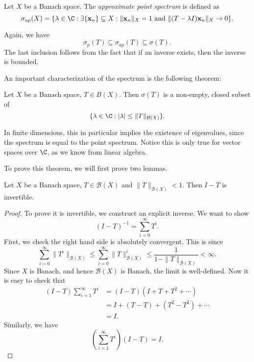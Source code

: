 \documentclass[a4paper]{article}
\begin{document}
\begin{defi}
  Let $X$ be a Banach space. The \emph{approximate point spectrum} is defined as
  \[
    \sigma_{ap}(X) = \{ \lambda \in \C: \exists \{\mathbf{x}_n\} \subseteq X: \|\mathbf{x}_n\|_X = 1\text{ and }\|(T - \lambda I)\mathbf{x}_n\|_X \to 0\}.
  \]
\end{defi}
Again, we have
\[
  \sigma_p(T) \subseteq \sigma_{ap}(T) \subseteq \sigma(T).
\]
The last inclusion follows from the fact that if an inverse exists, then the inverse is bounded.

An important characterization of the spectrum is the following theorem:
\begin{thm}
  Let $X$ be a Banach space, $T \in B(X)$. Then $\sigma(T)$ is a non-empty, closed subset of
  \[
    \{\lambda \in \C: |\lambda| \leq \|T\|_{\mathcal{B}(X)}\}.
  \]
\end{thm}
In finite dimensions, this in particular implies the existence of eigenvalues, since the spectrum is equal to the point spectrum. Notice this is only true for vector spaces over $\C$, as we know from linear algebra.

To prove this theorem, we will first prove two lemmas.
\begin{lemma}
  Let $X$ be a Banach space, $T \in \mathcal{B}(X)$ and $\|T\|_{\mathcal{B}(X)} < 1$. Then $I - T$ is invertible.
\end{lemma}

\begin{proof}
  To prove it is invertible, we construct an explicit inverse. We want to show
  \[
    (I - T)^{-1} = \sum_{i = 0}^\infty T^i.
  \]
  First, we check the right hand side is absolutely convergent. This is since
  \[
    \sum_{i = 0}^\infty \|T^i\|_{\mathcal{B}(X)} \leq \sum_{i = 0}^\infty \|T\|_{\mathcal{B}(X)}^i \leq \frac{1}{1 - \|T\|_{\mathcal{B}(X)}} < \infty.
  \]
  Since $X$ is Banach, and hence $\mathcal{B}(X)$ is Banach, the limit is well-defined. Now it is easy to check that
  \begin{align*}
    (I - T) \sum_{i = 1}^\infty T^i &= (I - T)(I + T + T^2 + \cdots) \\
    &= I + (T - T) + (T^2 - T^2) + \cdots \\
    &= I.
  \end{align*}
  Similarly, we have
  \[
    \left(\sum_{i = 1}^\infty T^i\right)(I - T) = I.
  \]
\end{proof}
\end{document}

